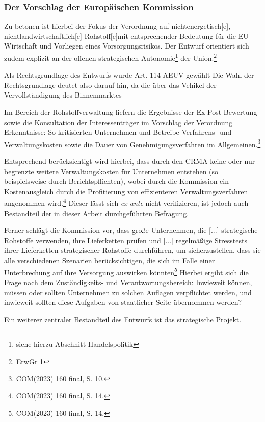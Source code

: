 \documentclass[12pt,a4paper,oneside]{book} %
\begin{document}
	\subsubsection{Der Vorschlag der Europäischen Kommission}
	
	Zu betonen ist hierbei der Fokus der Verordnung auf \glqq nichtenergetisch[e], nichtlandwirtschaftlich[e] Rohstoff[e]\grqq mit entsprechender Bedeutung für die EU-Wirtschaft und Vorliegen eines Vorsorgungsrisikos. Der Entwurf orientiert sich zudem explizit an der offenen strategischen Autonomie\footnote{siehe hierzu Abschnitt Handelspolitik} der Union.\footnote{ErwGr 1}
	
	Als Rechtsgrundlage des Entwurfs wurde Art. 114 AEUV gewählt
	Die Wahl der Rechtsgrundlage deutet also darauf hin, da die über das Vehikel der Vervollständigung des Binnenmarktes 
	
	Im Bereich der Rohstoffverwaltung liefern die Ergebnisse der Ex-Post-Bewertung sowie die Konsultation der Interessenträger im Vorschlag der Verordnung Erkenntnisse: So kritisierten Unternehmen und Betreibe Verfahrens- und Verwaltungskosten sowie die Dauer von Genehmigungsverfahren im Allgemeinen.\footnote{COM(2023) 160 final, S. 10.}
	
	Entsprechend berücksichtigt wird hierbei, dass durch den CRMA keine oder nur begrenzte weitere Verwaltungskosten für Unternehmen entstehen (so beispielsweise durch Berichtspflichten), wobei durch die Kommission ein Kostenausgleich durch die Profitierung von effizienteren Verwaltungsverfahren angenommen wird.\footnote{COM(2023) 160 final, S. 14.} Dieser lässt sich \textit{ex ante} nicht verifizieren, ist jedoch auch Bestandteil der in dieser Arbeit durchgeführten Befragung. %
	
	Ferner schlägt die Kommission vor, dass \glqq große Unternehmen, die [...] strategische Rohstoffe verwenden, ihre Lieferketten prüfen und [...] regelmäßige Stresstests ihrer Lieferketten strategischer Rohstoffe durchführen, um sicherzustellen, dass sie alle verschiedenen Szenarien berücksichtigen, die sich im Falle einer Unterbrechung auf ihre Versorgung auswirken könnten\grqq \footnote{COM(2023) 160 final, S. 14.} Hierbei ergibt sich die Frage nach dem Zuständigkeits- und Verantwortungsbereich: Inwieweit können, müssen oder sollten Unternehmen zu solchen Auflagen verpflichtet werden, und inwieweit sollten diese Aufgaben von staatlicher Seite übernommen werden?
	
	Ein weiterer zentraler Bestandteil des Entwurfs ist das \glqq strategische Projekt\grqq. %
	
\end{document}

